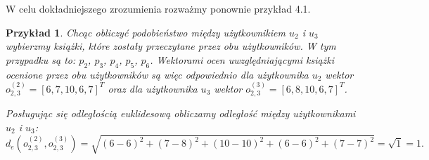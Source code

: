 \documentclass[12pt,a4paper]{report}
\newtheorem{przyklad}{Przykład}[chapter]
\begin{document}
W celu dokładniejszego zrozumienia rozważmy ponownie przykład 4.1.

\begin{przyklad}
Chcąc obliczyć podobieństwo między użytkownikiem $u_2$ i $u_3$ wybierzmy książki, które zostały przeczytane przez obu użytkowników. W tym przypadku są to: $p_2$, $p_3$, $p_4$, $p_5$, $p_6$. Wektorami ocen uwzględniającymi książki ocenione przez obu użytkowników są więc odpowiednio dla użytkownika $u_2$ wektor $o_{2,3} ^{(2)} = [6, 7, 10, 6, 7] ^ T$ oraz dla użytkownika $u_3$ wektor $o_{2,3}^{(3)} = [6, 8, 10, 6, 7] ^ T$.

Posługując się odległością euklidesową obliczamy odległość między użytkownikami $u_2$ i $u_3$: 
$$
d_{e}(o_{2,3}^{(2)},o_{2,3}^{(3)}) = \sqrt{(6-6)^2 + (7-8)^2 + (10-10)^2 + (6-6)^2 + (7-7)^2} = \sqrt{1} = 1.
$$


\end{przyklad}
\end{document}
